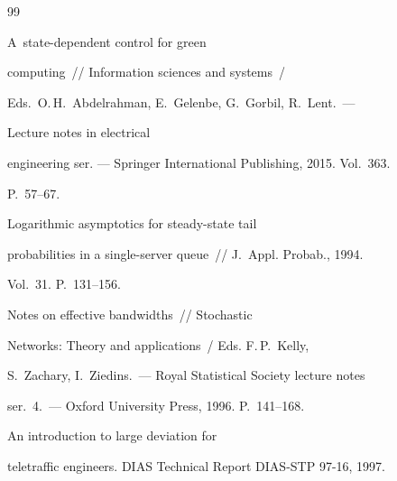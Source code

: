 {\small\frenchspacing


{%




\begin{thebibliography}{99}







  A~state-dependent control for green 


computing~/\!\!/ Information sciences and systems~/


Eds.\ O.\,H.~Abdelrahman, E.~Gelenbe, G.~Gorbil, R.~Lent.~---


 Lecture notes in electrical 


engineering ser. --- Springer International Publishing, 2015. Vol.~363.


P.~57--67.







 Logarithmic asymptotics for steady-state tail


probabilities in a single-server queue~/\!\!/ J.~Appl. Probab., 1994. 


Vol.~31. P.~131--156.







 Notes on   effective bandwidths~/\!\!/ Stochastic


Networks: Theory and applications~/  Eds. F.\,P.~Kelly,


S.~Zachary, I.~Ziedins.~--- Royal Statistical Society lecture notes 


ser.~4.~--- Oxford University Press, 1996. P.~141--168.







 An introduction to large deviation for


teletraffic engineers. DIAS Technical Report DIAS-STP 97-16, 1997.










\end{thebibliography}}}
